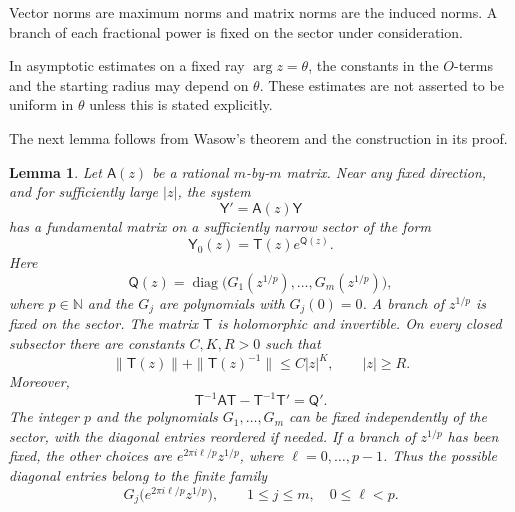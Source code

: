 \documentclass[a4paper,12pt]{article}
\newcommand{\N}{\mathbb{N}}
\newtheorem{lemma}[defin]{Lemma}
\numberwithin{equation}{section}
\begin{document}
Vector norms are maximum norms and matrix norms are the induced norms. A branch of each fractional power
is fixed on the sector under consideration.

In asymptotic estimates on a fixed ray $\arg z=\theta$, the constants
in the $O$-terms and the starting radius may depend on $\theta$.
These estimates are not asserted to be uniform in $\theta$ unless
this is stated explicitly.

The next lemma follows from Wasow's theorem
\cite[Theorem 19.1, pp.~111--112]{Wasow} and the construction in its proof.

\begin{lemma}\label{thm.Wasow}
Let $\mathsf{A}(z)$ be a rational $m$-by-$m$ matrix.
Near any fixed direction, and for sufficiently large $|z|$, the system
\[
 \mathsf{Y}'=\mathsf{A}(z)\mathsf{Y}
\]
has a fundamental matrix on a sufficiently narrow sector of the form
\begin{equation}\label{matrix.sol}
 \mathsf{Y}_0(z)=\mathsf{T}(z)e^{\mathsf{Q}(z)}.
\end{equation}
Here
\[
 \mathsf Q(z)=\operatorname{diag}
       \bigl(G_1(z^{1/p}),\ldots,G_m(z^{1/p})\bigr),
\]
where $p\in\N$ and the $G_j$ are polynomials with $G_j(0)=0$.
A branch of $z^{1/p}$ is fixed on the sector.
The matrix $\mathsf T$ is holomorphic and invertible.
On every closed subsector there are constants $C,K,R>0$ such that
\begin{equation}\label{eq.T.bounds}
 \|\mathsf{T}(z)\|+\|\mathsf{T}(z)^{-1}\|\le C|z|^K,
 \qquad |z|\ge R.
\end{equation}
Moreover,
\begin{equation}\label{eq.T.identity}
 \mathsf{T}^{-1}\mathsf{A}\mathsf{T}-\mathsf{T}^{-1}\mathsf{T}'=\mathsf{Q}'.
\end{equation}
The integer $p$ and the polynomials $G_1,\ldots,G_m$ can be fixed
independently of the sector, with the diagonal entries reordered if needed.
If a branch of $z^{1/p}$ has been fixed, the other choices are
$e^{2\pi i\ell/p}z^{1/p}$, where $\ell=0,\ldots,p-1$.
Thus the possible diagonal entries belong to the finite family
\[
 G_j\bigl(e^{2\pi i\ell/p}z^{1/p}\bigr),
 \qquad 1\le j\le m,\quad 0\le\ell<p.
\]
\end{lemma}
\end{document}
